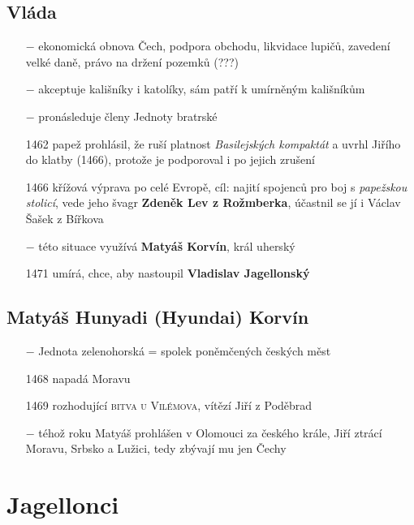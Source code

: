 \documentclass{article}
\begin{document}
\subsection*{Vláda}
\begin{itemize}
    \vspace{-0.5em}
    \setlength\itemsep{0.15em}
    \item[$-$] ekonomická obnova Čech, podpora obchodu, likvidace lupičů, zavedení velké daně, právo na držení pozemků (???)
    \item[$-$] akceptuje kališníky i katolíky, sám patří k umírněným kališníkům
    \item[$-$] pronásleduje členy Jednoty bratrské
    \item[1462] papež prohlásil, že ruší platnost \textit{Basilejských kompaktát} a uvrhl Jiřího do klatby (1466), protože je podporoval i po jejich zrušení
    \item[1466] křížová výprava po celé Evropě, cíl: najití spojenců pro boj s \textit{papežskou stolicí}, vede jeho švagr \textbf{Zdeněk Lev z Rožmberka}, účastnil se jí i Václav Šašek z Bířkova
    \item[$-$] této situace využívá \textbf{Matyáš Korvín}, král uherský
    \item[1471] umírá, chce, aby nastoupil \textbf{Vladislav Jagellonský}
\end{itemize}


\subsection*{Matyáš Hunyadi (Hyundai) Korvín}
\begin{itemize}
    \vspace{-0.5em}
    \setlength\itemsep{0.15em}
    \item[$-$] Jednota zelenohorská = spolek poněmčených českých měst
    \item[1468] napadá Moravu
    \item[1469] rozhodující \textsc{bitva u Vilémova}, vítězí Jiří z Poděbrad
    \item[$-$] téhož roku Matyáš prohlášen v Olomouci za českého krále, Jiří ztrácí Moravu, Srbsko a Lužici, tedy zbývají mu jen Čechy

\end{itemize}

\section*{Jagellonci}
\end{document}
